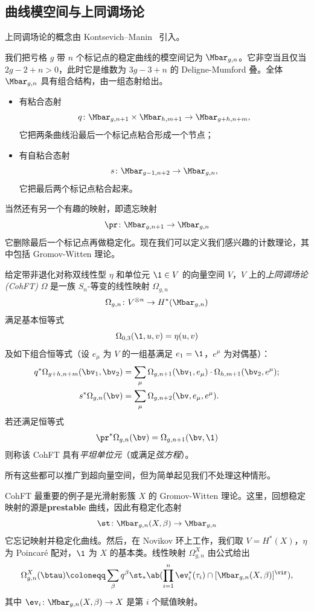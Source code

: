 \subsection{曲线模空间与上同调场论}%
\label{sub:Moduli of curves and CohFTs}

上同调场论的概念由 Kontsevich--Manin~\cite{KM1994} 引入。

我们把亏格 \(g\) 带 \(n\) 个标记点的稳定曲线的模空间记为 $\Mbar_{g,n}$。它非空当且仅当 \(2g-2+n > 0\)，此时它是维数为 \(3g-3+n\) 的 Deligne-Mumford 叠。全体 \(\Mbar_{g,n}\) 具有组合结构，由一组态射给出。
\begin{itemize}
    \item 有粘合态射
        \[q \colon \Mbar_{g,n+1} \times \Mbar_{h, m+1} \to \Mbar_{g+h,n+m}, \]
        它把两条曲线沿最后一个标记点粘合形成一个节点；
    \item 有自粘合态射 \[s \colon \Mbar_{g-1,n+2} \to \Mbar_{g,n},\]
        它把最后两个标记点粘合起来。
\end{itemize}
当然还有另一个有趣的映射，即遗忘映射
\[ \pr \colon \Mbar_{g,n+1} \to \Mbar_{g,n} \]
它删除最后一个标记点再做稳定化。现在我们可以定义我们感兴趣的计数理论，其中包括 Gromov-Witten 理论。

\begin{defn}
    给定带非退化对称双线性型 \(\eta\) 和单位元 \(\1 \in V\) 的向量空间 \(V\)，\(V\) 上的\textit{上同调场论 (CohFT)} \(\Omega\) 是一族 \(S_n\)-等变的线性映射 \(\Omega_{g,n}\)
    \[ \Omega_{g,n} \colon V^{\otimes n} \to H^*(\Mbar_{g,n}) \]
    满足基本恒等式
    \[ \Omega_{0,3}(\1, u,v) = \eta(u,v) \]
    及如下组合恒等式（设 \(e_{\mu}\) 为 \(V\) 的一组基满足 \(e_1 = \1\)，\(e^{\mu}\) 为对偶基）：
    \begin{align*}
        q^* \Omega_{g+h,n+m}(\bv_1, \bv_2) &= \sum_{\mu} \Omega_{g,n+1}(\bv_1, e_{\mu}) \cdot \Omega_{h,m+1}(  \bv_2, e^{\mu} ); \\
        s^* \Omega_{g,n}(\bv) &= \sum_{\mu} \Omega_{g,n+2}(\bv, e_{\mu}, e^{\mu}).
    \end{align*}
    若还满足恒等式
    \[ \pr^*\Omega_{g,n}(\bv) = \Omega_{g,n+1}(\bv,\1) \]
    则称该 CohFT 具有\textit{平坦单位元}（或满足\textit{弦方程}）。
\end{defn}
所有这些都可以推广到超向量空间，但为简单起见我们不处理这种情形。

\begin{exm}
    CohFT 最重要的例子是光滑射影簇 \(X\) 的 Gromov-Witten 理论。这里，回想稳定映射的源是\textbf{prestable} 曲线，因此有稳定化态射
    \[ \st \colon \Mbar_{g,n}(X,\beta) \to \Mbar_{g,n} \]
    它忘记映射并稳定化曲线。然后，在 Novikov 环上工作，我们取 \(V = H^*(X)\)，\(\eta\) 为 Poincar\'e 配对，\(\1\) 为 \(X\) 的基本类。线性映射 \(\Omega^X_{g,n}\) 由公式给出
    \[ \Omega_{g,n}^X(\btau) \coloneqq \sum_{\beta} q^{\beta} \st_* \ab(\prod_{i=1}^n \ev_i^*(\tau_i) \cap [\Mbar_{g,n}(X,\beta)]^{\vir}), \]
    其中 \(\ev_i \colon \Mbar_{g,n}(X,\beta) \to X\) 是第 \(i\) 个赋值映射。
\end{exm}

